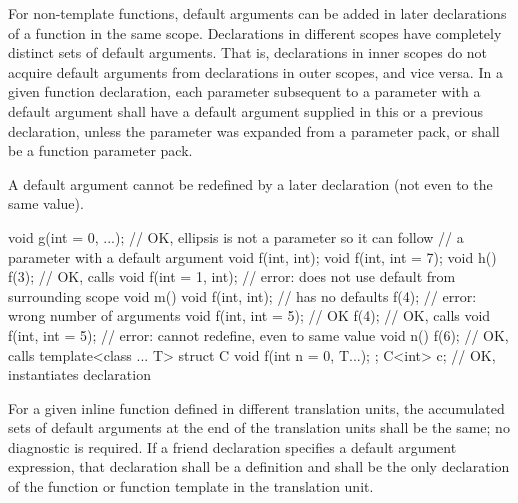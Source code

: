 \pnum
For non-template functions, default arguments can be added in later
declarations of a
function in the same scope.
Declarations in different
scopes have completely distinct sets of default arguments.
That
is, declarations in inner scopes do not acquire default
arguments from declarations in outer scopes, and vice versa.
In
a given function declaration, each parameter subsequent to a
parameter with a default argument shall have a default argument
supplied in this or a previous declaration,
unless the parameter was expanded from a parameter pack,
or shall be a function parameter pack.
\begin{note}
A default argument
cannot be redefined by a later declaration
(not even to the same value).
\end{note}
\begin{example}
\begin{codeblock}
void g(int = 0, ...);           // OK, ellipsis is not a parameter so it can follow
                                // a parameter with a default argument
void f(int, int);
void f(int, int = 7);
void h() {
  f(3);                         // OK, calls 
  void f(int = 1, int);         // error: does not use default from surrounding scope
}
void m() {
  void f(int, int);             // has no defaults
  f(4);                         // error: wrong number of arguments
  void f(int, int = 5);         // OK
  f(4);                         // OK, calls 
  void f(int, int = 5);         // error: cannot redefine, even to same value
}
void n() {
  f(6);                         // OK, calls 
}
template<class ... T> struct C {
  void f(int n = 0, T...);
};
C<int> c;                       // OK, instantiates declaration 
\end{codeblock}
\end{example}
For a given inline function defined in different translation units,
the accumulated sets of default arguments at the end of the
translation units shall be the same; no diagnostic is required.
If a friend declaration specifies a default argument expression,
that declaration shall be a definition and shall be the only
declaration of the function or function template in the translation unit.

